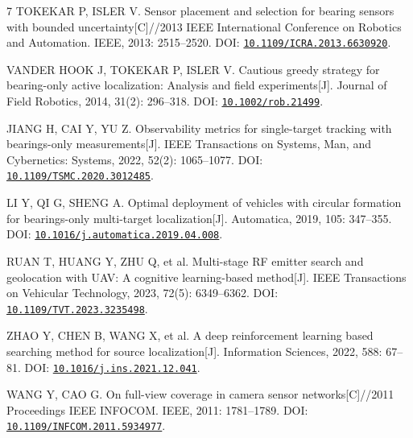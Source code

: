 \begin{thebibliography}{7}
TOKEKAR P, ISLER V. Sensor placement and selection for bearing sensors with bounded uncertainty[C]//2013 IEEE International Conference on Robotics and Automation. IEEE, 2013: 2515–2520. DOI: \href{https://doi.org/10.1109/ICRA.2013.6630920}{\nolinkurl{10.1109/ICRA.2013.6630920}}.

VANDER HOOK J, TOKEKAR P, ISLER V. Cautious greedy strategy for bearing-only active localization: Analysis and field experiments[J]. Journal of Field Robotics, 2014, 31(2): 296–318. DOI: \href{https://doi.org/10.1002/rob.21499}{\nolinkurl{10.1002/rob.21499}}.

JIANG H, CAI Y, YU Z. Observability metrics for single-target tracking with bearings-only measurements[J]. IEEE Transactions on Systems, Man, and Cybernetics: Systems, 2022, 52(2): 1065–1077. DOI: \href{https://doi.org/10.1109/TSMC.2020.3012485}{\nolinkurl{10.1109/TSMC.2020.3012485}}.

LI Y, QI G, SHENG A. Optimal deployment of vehicles with circular formation for bearings-only multi-target localization[J]. Automatica, 2019, 105: 347–355. DOI: \href{https://doi.org/10.1016/j.automatica.2019.04.008}{\nolinkurl{10.1016/j.automatica.2019.04.008}}.

RUAN T, HUANG Y, ZHU Q, et al. Multi-stage RF emitter search and geolocation with UAV: A cognitive learning-based method[J]. IEEE Transactions on Vehicular Technology, 2023, 72(5): 6349–6362. DOI: \href{https://doi.org/10.1109/TVT.2023.3235498}{\nolinkurl{10.1109/TVT.2023.3235498}}.

ZHAO Y, CHEN B, WANG X, et al. A deep reinforcement learning based searching method for source localization[J]. Information Sciences, 2022, 588: 67–81. DOI: \href{https://doi.org/10.1016/j.ins.2021.12.041}{\nolinkurl{10.1016/j.ins.2021.12.041}}.

WANG Y, CAO G. On full-view coverage in camera sensor networks[C]//2011 Proceedings IEEE INFOCOM. IEEE, 2011: 1781–1789. DOI: \href{https://doi.org/10.1109/INFCOM.2011.5934977}{\nolinkurl{10.1109/INFCOM.2011.5934977}}.

\end{thebibliography}
